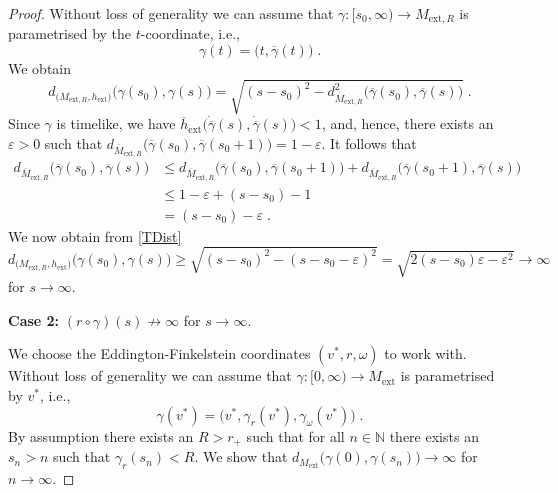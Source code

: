 \documentclass[reqno]{article}
\newcommand{\Mext}{M_{\mathrm{ext}}}
\newcommand{\ovg}{\overline{\gamma}}
\begin{document}
\begin{proof}
Without loss of generality we can assume that $\gamma : [s_0, \infty) \to M_{\mathrm{ext},R}$ is parametrised by the $t$-coordinate, i.e.,
\begin{equation*}
\gamma(t) = \big(t, \overline{\gamma}(t)\big) \;.
\end{equation*}
We obtain
\begin{equation}
\label{TDist}
d_{\big(M_{\mathrm{ext},R}, h_{\mathrm{ext}}\big)}\big(\gamma(s_0), \gamma(s)\big) = \sqrt{ (s-s_0)^2 - d_{\overline{M}_{\mathrm{ext}, R}}^2\big(\ovg(s_0), \ovg(s)\big) } \;.
\end{equation}
Since $\gamma$ is timelike, we have $\overline{h}_{\mathrm{ext}}\big(\dot{\ovg}(s), \dot{\ovg}(s)\big) < 1$, and, hence, there exists an $\varepsilon >0$ such that $d_{\overline{M}_{\mathrm{ext}, R}}\big(\ovg(s_0), \ovg(s_0 + 1)\big) = 1 - \varepsilon$. It follows that
\begin{equation*}
\begin{split}
d_{\overline{M}_{\mathrm{ext}, R}}\big(\ovg(s_0), \ovg(s)\big) &\leq d_{\overline{M}_{\mathrm{ext}, R}}\big(\ovg(s_0), \ovg(s_0 + 1) \big) + d_{\overline{M}_{\mathrm{ext}, R}}\big(\ovg(s_0 + 1), \ovg(s)\big) \\
&\leq 1- \varepsilon + (s-s_0) -1 \\
&= (s-s_0) -\varepsilon \;.
\end{split}
\end{equation*}
We now obtain from \eqref{TDist}
\begin{equation*}
d_{\big(M_{\mathrm{ext},R}, h_{\mathrm{ext}}\big)}\big(\gamma(s_0), \gamma(s)\big) \geq \sqrt{(s-s_0)^2 - (s-s_0 - \varepsilon)^2} = \sqrt{2(s-s_0)\varepsilon - \varepsilon^2} \to \infty 
\end{equation*}
for $s \to \infty$.
\vspace*{2mm}

\textbf{Case 2:} $(r \circ \gamma)(s) \not\to \infty$ for $s \to \infty$.
\vspace*{2mm}

We choose the Eddington-Finkelstein coordinates $(v^*, r, \omega)$ to work with. Without loss of generality we can assume that $\gamma : [0, \infty) \to \Mext$ is parametrised by $v^*$, i.e.,
\begin{equation*}
\gamma(v^*) = \big(v^*, \gamma_r(v^*), \gamma_\omega(v^*)\big) \;.
\end{equation*}
By assumption there exists an $R>r_+$ such that for all $n \in \mathbb{N}$ there exists an $s_n > n$ such that $\gamma_r(s_n) < R$. We show that $d_{\Mext}\big(\gamma(0), \gamma(s_n) \big) \to \infty$ for $n \to \infty$.


\end{proof}
\end{document}
